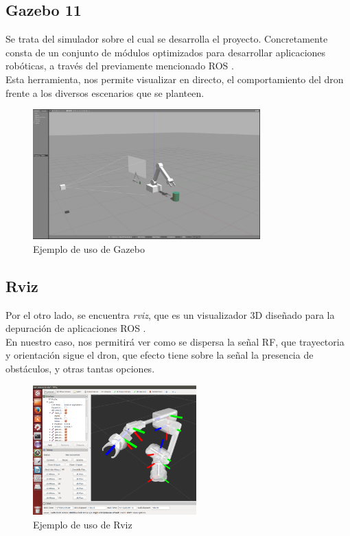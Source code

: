\subsection{Gazebo 11}
\label{subsec:gazebo}

Se trata del simulador sobre el cual se desarrolla el proyecto. Concretamente consta de un conjunto de módulos optimizados para desarrollar aplicaciones robóticas, a través del previamente mencionado \ac{ROS} \cite{gazebo-def}.\\

Esta herramienta, nos permite visualizar en directo, el comportamiento del dron frente a los diversos escenarios que se planteen.

\begin{figure} [H]
	\begin{center}
	\includegraphics[height=5cm]{imagenes/cap3/2_gazebo_example.JPEG}
	\end{center}
	\caption[Ejemplo de uso de Gazebo]{Ejemplo de uso de Gazebo}
	\label{fig:gazebo}
\end{figure}

\subsection{Rviz}
\label{subsec:rviz}

Por el otro lado, se encuentra \emph{rviz}, que es un visualizador 3D diseñado para la depuración de aplicaciones \ac{ROS} \cite{rviz-def}.\\

En nuestro caso, nos permitirá ver como se dispersa la señal \ac{RF}, que trayectoria y orientación sigue el dron, que efecto tiene sobre la señal la presencia de obstáculos, y otras tantas opciones.\\

\begin{figure} [H]
	\begin{center}
	\includegraphics[height=5cm]{imagenes/cap3/3_rviz_example.png}
	\end{center}
	\caption[Ejemplo de uso de Rviz]{Ejemplo de uso de Rviz}
	\label{fig:rviz}
\end{figure}

